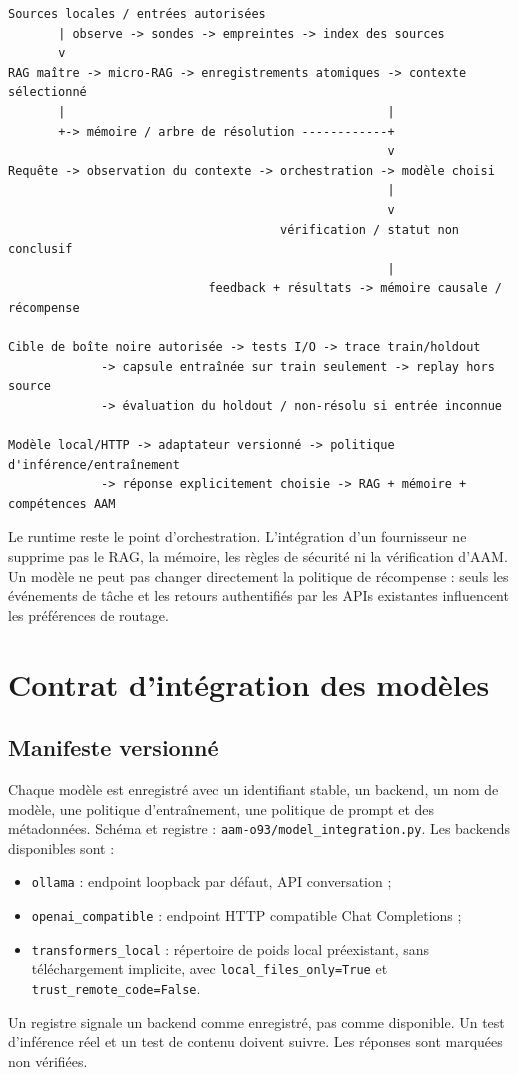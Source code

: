 \documentclass[11pt,a4paper]{article}
\begin{document}
\begin{verbatim}
Sources locales / entrées autorisées
       | observe -> sondes -> empreintes -> index des sources
       v
RAG maître -> micro-RAG -> enregistrements atomiques -> contexte sélectionné
       |                                             |
       +-> mémoire / arbre de résolution ------------+
                                                     v
Requête -> observation du contexte -> orchestration -> modèle choisi
                                                     |
                                                     v
                                      vérification / statut non conclusif
                                                     |
                            feedback + résultats -> mémoire causale / récompense

Cible de boîte noire autorisée -> tests I/O -> trace train/holdout
             -> capsule entraînée sur train seulement -> replay hors source
             -> évaluation du holdout / non-résolu si entrée inconnue

Modèle local/HTTP -> adaptateur versionné -> politique d'inférence/entraînement
             -> réponse explicitement choisie -> RAG + mémoire + compétences AAM
\end{verbatim}

Le runtime reste le point d'orchestration. L'intégration d'un fournisseur ne supprime pas le RAG, la mémoire, les règles de sécurité ni la vérification d'AAM. Un modèle ne peut pas changer directement la politique de récompense : seuls les événements de tâche et les retours authentifiés par les APIs existantes influencent les préférences de routage.

\section{Contrat d'intégration des modèles}
\subsection{Manifeste versionné}
Chaque modèle est enregistré avec un identifiant stable, un backend, un nom de modèle, une politique d'entraînement, une politique de prompt et des métadonnées. Schéma et registre : \texttt{aam-o93/model\_integration.py}. Les backends disponibles sont :
\begin{itemize}[nosep]
\item \texttt{ollama} : endpoint loopback par défaut, API conversation ;
\item \texttt{openai\_compatible} : endpoint HTTP compatible Chat Completions ;
\item \texttt{transformers\_local} : répertoire de poids local préexistant, sans téléchargement implicite, avec \texttt{local\_files\_only=True} et \texttt{trust\_remote\_code=False}.
\end{itemize}
Un registre signale un backend comme enregistré, pas comme disponible. Un test d'inférence réel et un test de contenu doivent suivre. Les réponses sont marquées non vérifiées.
\end{document}
